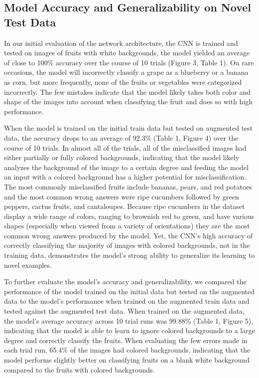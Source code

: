 \documentclass[11pt]{article}
\begin{document}
\subsection{Model Accuracy and Generalizability on Novel Test Data}
In our initial evaluation of the network architecture, the CNN is trained and tested on images of fruits with white backgrounds, the model yielded an average of close to 100\% accuracy over the course of 10 trials (Figure 3, Table 1). On rare occasions, the model will incorrectly classify a grape as a blueberry or a banana as corn, but more frequently, none of the fruits or vegetables were categorized incorrectly. The few mistakes indicate that the model likely takes both color and shape of the images into account when classifying the fruit and does so with high performance.

When the model is trained on the initial train data but tested on augmented test data, the accuracy drops to an average of 92.3\% (Table 1, Figure 4) over the course of 10 trials. In almost all of the trials, all of the misclassified images had either partially or fully colored backgrounds, indicating that the model likely analyzes the background of the image to a certain degree and feeding the model an input with a colored background has a higher potential for misclassification. The most commonly misclassified fruits include bananas, pears, and red potatoes and the most common wrong answers were ripe cucumbers followed by green peppers, cactus fruits, and cantaloupes. Because ripe cucumbers in the dataset display a wide range of colors, ranging to brownish red to green, and have various shapes (especially when viewed from a variety of orientations) they are the most common wrong answers produced by the model. Yet, the CNN's high accuracy of correctly classifying the majority of images with colored backgrounds, not in the training data, demonstrates the model's strong ability to generalize its learning to novel examples. 

To further evaluate the model's accuracy and generalizability, we compared the performance of the model trained on the initial data but tested on the augmented data to the model's performance when trained on the augmented train data and tested against the augmented test data. When trained on the augmented data, the model's average accuracy across 10 trial runs was 99.88\% (Table 1, Figure 5), indicating that the model is able to learn to ignore colored backgrounds to a large degree and correctly classify the fruits. When evaluating the few errors made in each trial run, 65.4\% of the images had colored backgrounds, indicating that the model performs slightly better on classifying fruits on a blank white background compared to the fruits with colored backgrounds.
\end{document}

